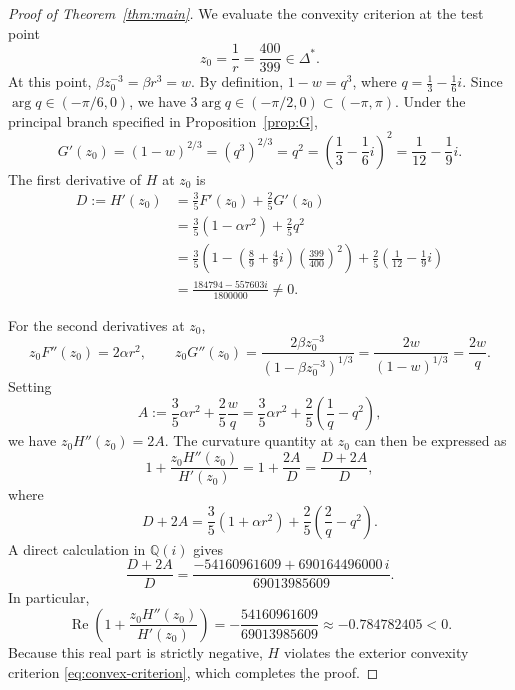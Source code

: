 \documentclass[10pt,a4paper]{amsart}
\renewcommand{\Re}{\operatorname{Re}}
\begin{document}
\begin{proof}[Proof of Theorem~\ref{thm:main}]
We evaluate the convexity criterion at the test point
\begin{equation}
z_0 = \frac{1}{r} = \frac{400}{399} \in \Delta^*.
\end{equation}
At this point, $\beta z_0^{-3} = \beta r^3 = w$. By definition, $1 - w = q^3$, where $q = \frac{1}{3} - \frac{1}{6}i$. Since $\arg q \in (-\pi/6, 0)$, we have $3\arg q \in (-\pi/2, 0) \subset (-\pi, \pi)$. Under the principal branch specified in Proposition~\ref{prop:G},
\begin{equation}
G'(z_0) = (1 - w)^{2/3} = (q^3)^{2/3} = q^2 = \left(\frac{1}{3} - \frac{1}{6}i\right)^2 = \frac{1}{12} - \frac{1}{9}i.
\end{equation}
The first derivative of $H$ at $z_0$ is
\begin{align}
D := H'(z_0) &= \frac{3}{5} F'(z_0) + \frac{2}{5} G'(z_0) \nonumber\\
&= \frac{3}{5}(1 - \alpha r^2) + \frac{2}{5} q^2 \nonumber\\
&= \frac{3}{5}\left(1 - \left(\frac{8}{9} + \frac{4}{9}i\right)\left(\frac{399}{400}\right)^2\right) + \frac{2}{5}\left(\frac{1}{12} - \frac{1}{9}i\right) \nonumber\\
&= \frac{184794 - 557603i}{1800000} \neq 0.
\end{align}

For the second derivatives at $z_0$,
\begin{equation}
z_0 F''(z_0) = 2\alpha r^2, \qquad z_0 G''(z_0) = \frac{2\beta z_0^{-3}}{(1 - \beta z_0^{-3})^{1/3}} = \frac{2w}{(1 - w)^{1/3}} = \frac{2w}{q}.
\end{equation}
Setting
\begin{equation}
A := \frac{3}{5}\alpha r^2 + \frac{2}{5}\frac{w}{q} = \frac{3}{5}\alpha r^2 + \frac{2}{5}\left(\frac{1}{q} - q^2\right),
\end{equation}
we have $z_0 H''(z_0) = 2A$. The curvature quantity at $z_0$ can then be expressed as
\begin{equation}
1 + \frac{z_0 H''(z_0)}{H'(z_0)} = 1 + \frac{2A}{D} = \frac{D + 2A}{D},
\end{equation}
where
\begin{equation}
D + 2A = \frac{3}{5}(1 + \alpha r^2) + \frac{2}{5}\left(\frac{2}{q} - q^2\right).
\end{equation}
A direct calculation in $\mathbb{Q}(i)$ gives
\begin{equation}
\frac{D + 2A}{D} = \frac{-54160961609 + 690164496000\,i}{69013985609}.
\end{equation}
In particular,
\begin{equation}
\Re\left(1 + \frac{z_0 H''(z_0)}{H'(z_0)}\right) = -\frac{54160961609}{69013985609} \approx -0.784782405 < 0.
\end{equation}
Because this real part is strictly negative, $H$ violates the exterior convexity criterion \eqref{eq:convex-criterion}, which completes the proof.
\end{proof}
\end{document}
